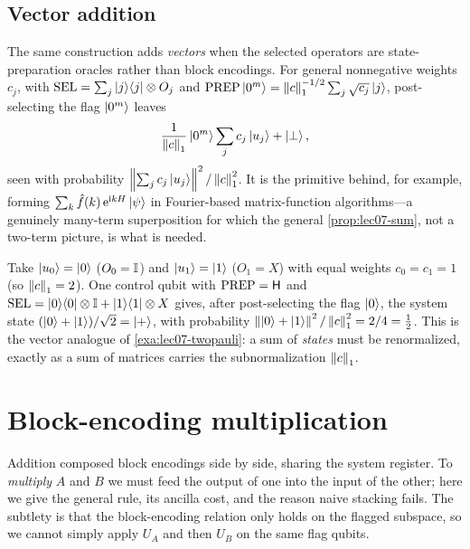 \subsection*{Vector addition}

The same construction adds \emph{vectors} when the selected operators are
state-preparation oracles rather than block encodings. For general nonnegative
weights $c_j$, with $\mathrm{SEL}=\sum_j\ket{j}\!\bra{j}\otimes O_j$ and
$\mathrm{PREP}\ket{0^m}=\left\lVert c \right\rVert_1^{-1/2}\sum_j\sqrt{c_j}\ket{j}$, post-selecting the
flag $\ket{0^m}$ leaves
\[
  \frac{1}{\left\lVert c \right\rVert_1}\ket{0^m}\sum_{j}c_j\ket{u_j}+\ket{\perp},
\]
seen with probability $\left\lVert \sum_j c_j\ket{u_j} \right\rVert^2/\left\lVert c \right\rVert_1^2$. It is the primitive
behind, for example, forming $\sum_k \hat f(k)\,\mathrm{e}^{\mathrm{i} k H}\ket{\psi}$ in
Fourier-based matrix-function algorithms---a genuinely many-term superposition for
which the general \cref{prop:lec07-sum}, not a two-term picture, is what is needed.

\begin{example}
\label{exa:lec07-vecadd}
Take $\ket{u_0}=\ket0$ ($O_0=\mathbb{I}$) and $\ket{u_1}=\ket1$ ($O_1=X$) with equal weights
$c_0=c_1=1$ (so $\left\lVert c \right\rVert_1=2$). One control qubit with $\mathrm{PREP}=\mathsf{H}$ and
$\mathrm{SEL}=\ket{0}\!\bra{0}\otimes\mathbb{I}+\ket{1}\!\bra{1}\otimes X$ gives, after post-selecting the flag
$\ket0$, the system state $(\ket0+\ket1)/\sqrt2=\ket+$, with probability
$\left\lVert \ket0+\ket1 \right\rVert^2/\left\lVert c \right\rVert_1^2=2/4=\tfrac12$. This is the vector analogue of
\cref{exa:lec07-twopauli}: a sum of \emph{states} must be renormalized, exactly as a
sum of matrices carries the subnormalization $\left\lVert c \right\rVert_1$.
\end{example}

\section{Block-encoding multiplication}
\label{sec:lec07-3}

Addition composed block encodings side by side, sharing the system register. To
\emph{multiply} $A$ and $B$ we must feed the output of one into the input of the
other; here we give the general rule, its ancilla cost, and the reason
naive stacking fails. The subtlety is that the block-encoding relation only holds on
the flagged subspace, so we cannot simply apply $U_A$ and then $U_B$ on the same flag
qubits.

